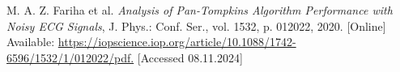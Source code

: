 
\begin{thebibliography}{99}
\small

M. A. Z. Fariha et al. \emph{Analysis of Pan-Tompkins Algorithm Performance with Noisy ECG Signals}, J. Phys.: Conf. Ser., vol. 1532, p. 012022, 2020. [Online] Available: \href{https://iopscience.iop.org/article/10.1088/1742-6596/1532/1/012022/pdf}{https://iopscience.iop.org/article/10.1088/1742-6596/1532/1/012022/pdf.} [Accessed 08.11.2024] 

\end{thebibliography}